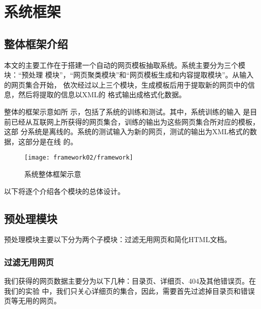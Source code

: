 
\chapter{系统框架}
\label{chap:framework}
\section{整体框架介绍}
\label{sec:wholeframework}
本文的主要工作在于搭建一个自动的网页模板抽取系统。系统主要分为三个模块：“预处理
模块”，“网页聚类模块”和“网页模板生成和内容提取模块”。从输入的网页集合开始，
依次经过以上三个模块，生成模板后用于提取新的网页中的信息，然后将提取的信息以XML的
格式输出成格式化数据。

整体的框架示意如所
示，包括了系统的训练和测试。其中，系统训练的输入
是目前已经从互联网上所获得的网页集合，训练的输出为这些网页集合所对应的模板，这部
分系统是离线的。系统的测试输入为新的网页，测试的输出为XML格式的数据，这部分是在线
的。

\begin{figure}
  \centering
  \texttt{[image: framework02/framework]}
  \caption{系统整体框架示意}
  \label{framework:fig:framework}
\end{figure}

以下将逐个介绍各个模块的总体设计。
\section{预处理模块}
\label{sec:filterintro}
预处理模块主要以下分为两个子模块：过滤无用网页和简化HTML文档。
\subsection{过滤无用网页}
\label{sec:filterintro-useless}
我们获得的网页数据主要分为以下几种：目录页、详细页、404及其他错误页。在我们的实验
中，我们只关心详细页的集合，因此，需要首先过滤掉目录页和错误页等无用的网页。

